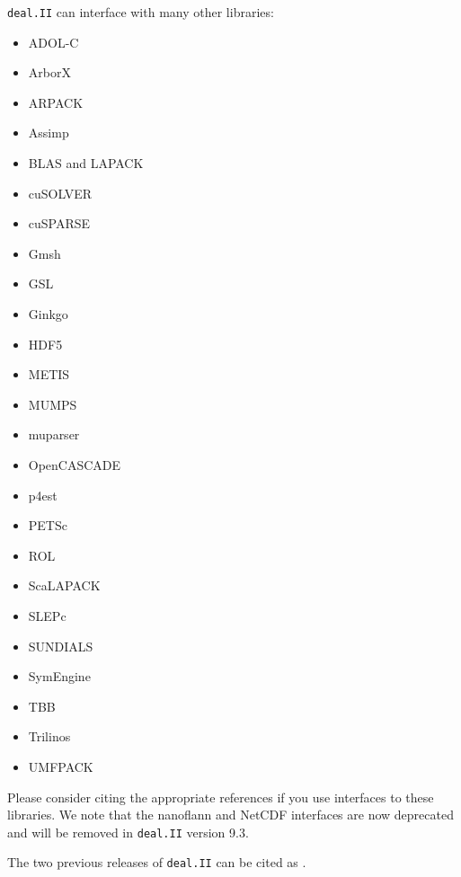 \documentclass{ansarticle-preprint}
\newcommand{\specialword}[1]{\texttt{#1}}
\newcommand{\dealii}{{\specialword{deal.II}}\xspace}
\begin{document}
\dealii{} can interface with many other libraries:
\begin{multicols}{3}
  \begin{itemize}
    \item ADOL-C \cite{Griewank1996a,adol-c}
    \item ArborX
    \item ARPACK \cite{arpack}
    \item Assimp \cite{assimp}
    \item BLAS and LAPACK \cite{lapack}
    \item cuSOLVER \cite{cusolver}
    \item cuSPARSE \cite{cusparse}
    \item Gmsh \cite{geuzaine2009gmsh}
    \item GSL \cite{gsl2016}
    \item Ginkgo \cite{ginkgo-web-page}
    \item HDF5 \cite{hdf5}
    \item METIS \cite{karypis1998fast}
    \item MUMPS \cite{ADE00,MUMPS:1,MUMPS:2,mumps-web-page}
    \item muparser \cite{muparser-web-page}
    \item OpenCASCADE \cite{opencascade-web-page}
    \item p4est \cite{p4est}
    \item PETSc \cite{petsc-user-ref,petsc-web-page}
    \item ROL \cite{ridzal2014rapid}
    \item ScaLAPACK \cite{slug}
    \item SLEPc \cite{Hernandez:2005:SSF}
    \item SUNDIALS \cite{sundials}
    \item SymEngine \cite{symengine-web-page}
    \item TBB \cite{Rei07}
    \item Trilinos \cite{trilinos,trilinos-web-page}
    \item UMFPACK \cite{umfpack}
  \end{itemize}
\end{multicols}
Please consider citing the appropriate references if you use
interfaces to these libraries. We note that the nanoflann and NetCDF
interfaces are now deprecated and will be removed in \dealii{} version
9.3.

The two previous releases of \dealii{} can be cited as
\cite{dealII91,dealII92}.
\end{document}
